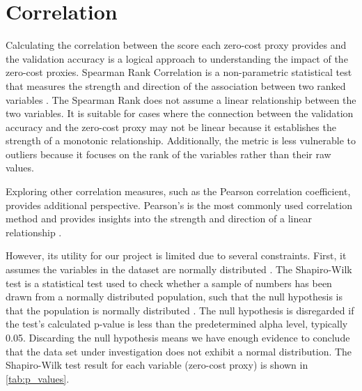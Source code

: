 \section{Correlation}\label{sec:corr}

Calculating the correlation between the score each zero-cost proxy provides and the validation accuracy is a logical approach to understanding the impact of the zero-cost proxies. Spearman Rank Correlation is a non-parametric statistical test that measures the strength and direction of the association between two ranked variables \autocite{hauke2011comparison}. The Spearman Rank does not assume a linear relationship between the two variables. It is suitable for cases where the connection between the validation accuracy and the zero-cost proxy may not be linear because it establishes the strength of a monotonic relationship. Additionally, the metric is less vulnerable to outliers because it focuses on the rank of the variables rather than their raw values.

Exploring other correlation measures, such as the Pearson correlation coefficient, provides additional perspective. Pearson's is the most commonly used correlation method and provides insights into the strength and direction of a linear relationship \autocite{turney2022pearson}. 

However, its utility for our project is limited due to several constraints. First, it assumes the variables in the dataset are normally distributed \autocite{turney2022pearson}. The Shapiro-Wilk test is a statistical test used to check whether a sample of numbers has been drawn from a normally distributed population, such that the null hypothesis is that the population is normally distributed \autocite{shaphiro1965analysis}. The null hypothesis is disregarded if the test's calculated p-value is less than the predetermined alpha level, typically 0.05. Discarding the null hypothesis means we have enough evidence to conclude that the data set under investigation does not exhibit a normal distribution. The Shapiro-Wilk test result for each variable (zero-cost proxy) is shown in \cref{tab:p_values}. 

